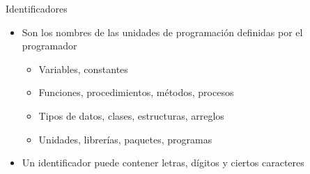 \begin{frame}[c]{Identificadores}
  \begin{itemize}
    \item Son los nombres de las unidades de programación definidas por el
      programador
      \begin{itemize}
        \item Variables, constantes
        \item Funciones, procedimientos, métodos, procesos
        \item Tipos de datos, clases, estructuras, arreglos
        \item Unidades, librerías, paquetes, programas
      \end{itemize}
    \pausa
    \item Un identificador puede contener letras, dígitos y ciertos caracteres
  \end{itemize}
\end{frame}
